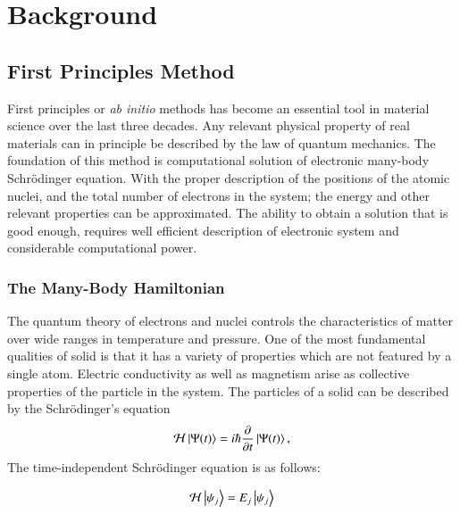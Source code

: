 \chapter{Background}\label{chp:bckgrnd}

\section{First Principles Method}
First principles or \textit{ab initio} methods has become an essential tool in material science over the last three decades. Any relevant physical property of real materials can in principle be described by the law of quantum mechanics. The foundation of this method is computational solution of electronic many-body Schr\"odinger equation. With the proper description of the positions of the atomic nuclei, and the total number of electrons in the system; the energy and other relevant properties can be approximated. The ability to obtain a solution that is good enough, requires well efficient description of electronic system and considerable  computational power.



\subsection{The Many-Body Hamiltonian}
The quantum theory of electrons and nuclei controls the characteristics of matter over wide ranges in temperature and pressure. One of the most fundamental qualities of solid is that it has a variety of properties which are not featured by a single atom. Electric conductivity as well as magnetism arise as collective properties of the particle in the system. The particles of a solid can be described by the Schr\"odinger's equation
\begin{equation}
	\mathcal{H}\ket{\Psi(t)} = i\hbar  \frac{\partial}{\partial t}\ket{\Psi(t)},
\end{equation}
The time-independent Schr\"odinger equation is as follows:


\begin{equation}\label{sheqn}
	\mathcal{H}\ket{\psi_j} = E_j\ket{\psi_j}
\end{equation}

